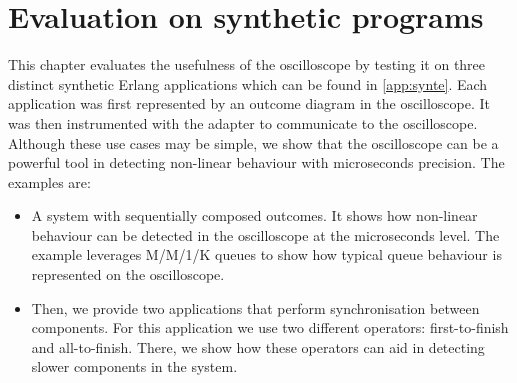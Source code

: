 \chapter{Evaluation on synthetic programs}
    This chapter evaluates the usefulness of the oscilloscope by testing it on three distinct synthetic Erlang applications which can be found in \cref{app:synte}. Each application was first represented by an outcome diagram in the oscilloscope. It was then instrumented with the adapter to communicate to the oscilloscope.
    Although these use cases may be simple, we show that the oscilloscope can be a powerful tool in detecting non-linear behaviour with microseconds precision. The examples are:
    \begin{itemize}
        \item A system with sequentially composed outcomes. It shows how non-linear behaviour can be detected in the oscilloscope at the microseconds level. The example leverages M/M/1/K queues to show how typical queue behaviour is represented on the oscilloscope.
        \item Then, we provide two applications that perform synchronisation between components. For this application we use two different operators: first-to-finish and all-to-finish. There, we show how these operators can aid in detecting slower components in the system.
    \end{itemize}
    
    
    
